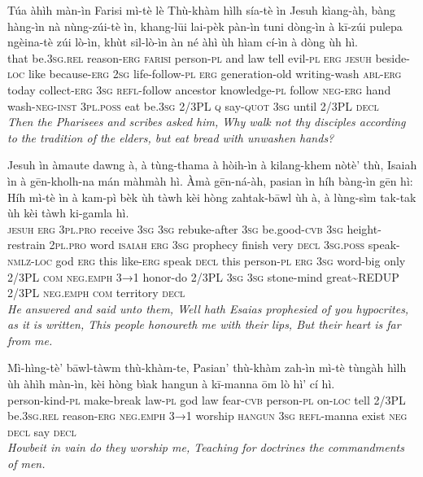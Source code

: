 \documentclass[11pt,a4paper]{article}
\begin{document}
\begin{exe}
\gll Túa àhìh màn-ìn Farisi mì-tè lè Thù-khàm hìlh sía-tè ìn Jesuh kìang-àh, bàng hàng-ìn nà nùng-zúi-tè ìn, khang-lūi lai-pèk pàn-ìn tuni dòng-ìn à kī-zúi pulepa ngèina-tè zúi lò-ìn, khùt sil-lò-ìn àn né àhì ùh hìam cí-ìn à dòng ùh hì. \\
     that be.\textsc{3sg}.\textsc{rel} reason-\textsc{erg} \textsc{farisi} person-\textsc{pl} and law tell evil-\textsc{pl} \textsc{erg} \textsc{jesuh} beside-\textsc{loc} like because-\textsc{erg} \textsc{2sg} life-follow-\textsc{pl} \textsc{erg} generation-old writing-wash \textsc{abl}-\textsc{erg} today collect-\textsc{erg} \textsc{3sg} \textsc{refl}-follow ancestor knowledge-\textsc{pl} follow \textsc{neg}-\textsc{erg} hand wash-\textsc{neg}-\textsc{inst} \textsc{3pl}.\textsc{poss} eat be.\textsc{3sg} 2/3PL \textsc{q} say-\textsc{quot} \textsc{3sg} until 2/3PL \textsc{decl} \\
\glt \textcolor{kjvcolor}{\textit{Then the Pharisees and scribes asked him, Why walk not thy disciples according to the tradition of the elders, but eat bread with unwashen hands?}}

\gll Jesuh ìn àmaute dawng à, à tùng-thama à hòih-ìn à kilang-khem nòtè' thù, Isaiah ìn à gēn-kholh-na mán màhmàh hì. Àmà gēn-ná-àh, pasian ìn híh bàng-ìn gēn hì: Híh mì-tè ìn à kam-pì bèk ùh tàwh kèi hòng zahtak-bāwl ùh à, à lùng-sìm tak-tak ùh kèi tàwh ki-gamla hì. \\
     \textsc{jesuh} \textsc{erg} \textsc{3pl}.\textsc{pro} receive \textsc{3sg} \textsc{3sg} rebuke-after \textsc{3sg} be.good-\textsc{cvb} \textsc{3sg} height-restrain \textsc{2pl}.\textsc{pro} word \textsc{isaiah} \textsc{erg} \textsc{3sg} prophecy finish very \textsc{decl} \textsc{3sg}.\textsc{poss} speak-\textsc{nmlz}-\textsc{loc} god \textsc{erg} this like-\textsc{erg} speak \textsc{decl} this person-\textsc{pl} \textsc{erg} \textsc{3sg} word-big only 2/3PL \textsc{com} \textsc{neg}.\textsc{emph} \textsc{3→1} honor-do 2/3PL \textsc{3sg} \textsc{3sg} stone-mind great\textasciitilde{}REDUP 2/3PL \textsc{neg}.\textsc{emph} \textsc{com} territory \textsc{decl} \\
\glt \textcolor{kjvcolor}{\textit{He answered and said unto them, Well hath Esaias prophesied of you hypocrites, as it is written, This people honoureth me with their lips, But their heart is far from me.}}

\gll Mì-hìng-tè' bāwl-tàwm thù-khàm-te, Pasian' thù-khàm zah-ìn mì-tè tùngàh hìlh ùh àhìh màn-ìn, kèi hòng bìak hangun à kī-manna ōm lò hì' cí hì. \\
     person-kind-\textsc{pl} make-break law-\textsc{pl} god law fear-\textsc{cvb} person-\textsc{pl} on-\textsc{loc} tell 2/3PL be.\textsc{3sg}.\textsc{rel} reason-\textsc{erg} \textsc{neg}.\textsc{emph} \textsc{3→1} worship \textsc{hangun} \textsc{3sg} \textsc{refl}-manna exist \textsc{neg} \textsc{decl} say \textsc{decl} \\
\glt \textcolor{kjvcolor}{\textit{Howbeit in vain do they worship me, Teaching for doctrines the commandments of men.}}


\end{exe}
\end{document}
